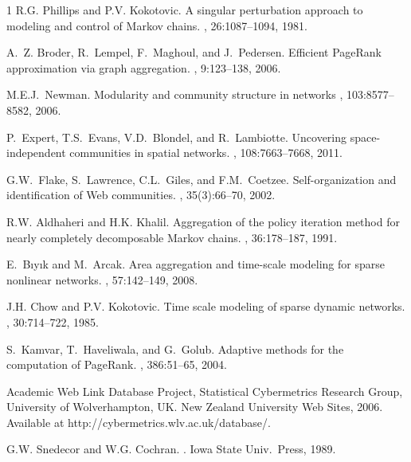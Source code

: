 \documentclass[11pt,draftcls,onecolumn]{IEEEtran}
\begin{document}
\begin{thebibliography}{1}
R.{\;}G. Phillips and P.{\;}V. Kokotovic.
\newblock A singular perturbation approach to modeling and control of {M}arkov
  chains.
, 26:1087--1094, 1981.

A.~Z. Broder, R.~Lempel, F.~Maghoul, and J.~Pedersen.
\newblock Efficient {P}age{R}ank approximation via graph aggregation.
, 9:123--138, 2006.

M.{\;}E.{\;}J.~Newman.
\newblock Modularity and community structure in networks
, 
103:8577--8582, 2006.

P.~Expert, T.\;S.~Evans, V.{\;}D.~Blondel, and R.\ Lambiotte.
\newblock Uncovering space-independent communities in spatial networks.
, 
108:7663--7668, 2011.

G.\;W.~Flake, S.~Lawrence, C.\;L.~Giles, and F.\;M.\ Coetzee.
\newblock Self-organization and identification of Web communities.
, 35(3):66--70, 2002.



R.{\;}W. Aldhaheri and H.{\;}K. Khalil.
\newblock Aggregation of the policy iteration method for nearly completely
  decomposable {M}arkov chains.
, 36:178--187, 1991.

E.~B{\i}y{\i}k and M.~Arcak.
\newblock Area aggregation and time-scale modeling for sparse nonlinear
  networks.
, 57:142--149, 2008.

J.{\;}H. Chow and P.{\;}V. Kokotovic.
\newblock Time scale modeling of sparse dynamic networks.
, 30:714--722, 1985.


S.~Kamvar, T.~Haveliwala, and G.~Golub.
\newblock Adaptive methods for the computation of {P}age{R}ank.
, 386:51--65, 2004.

Academic Web Link Database Project, 
Statistical Cybermetrics Research Group,
University of Wolverhampton, UK.
New Zealand University Web Sites, 2006.
\newblock 
Available at http://cybermetrics.wlv.ac.uk/database/.


G.{\;}W. Snedecor and W.{\;}G. Cochran.
.
\newblock Iowa State Univ.\ Press, 1989.



\end{thebibliography}
\end{document}
